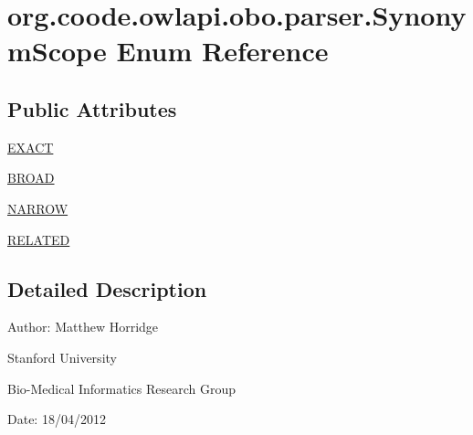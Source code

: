 \hypertarget{enumorg_1_1coode_1_1owlapi_1_1obo_1_1parser_1_1_synonym_scope}{\section{org.\-coode.\-owlapi.\-obo.\-parser.\-Synonym\-Scope Enum Reference}
\label{enumorg_1_1coode_1_1owlapi_1_1obo_1_1parser_1_1_synonym_scope}
}
\subsection*{Public Attributes}
\begin{DoxyCompactItemize}
\item 
\hyperlink{enumorg_1_1coode_1_1owlapi_1_1obo_1_1parser_1_1_synonym_scope_a2563ad43be4853645037f1b107dc4f08}{E\-X\-A\-C\-T}
\item 
\hyperlink{enumorg_1_1coode_1_1owlapi_1_1obo_1_1parser_1_1_synonym_scope_a2f2dd03be7aacef09bf13f6800547131}{B\-R\-O\-A\-D}
\item 
\hyperlink{enumorg_1_1coode_1_1owlapi_1_1obo_1_1parser_1_1_synonym_scope_af12219f678015a480e35d7888f481144}{N\-A\-R\-R\-O\-W}
\item 
\hyperlink{enumorg_1_1coode_1_1owlapi_1_1obo_1_1parser_1_1_synonym_scope_af20c2de5c54a82283f18180ad743cd6c}{R\-E\-L\-A\-T\-E\-D}
\end{DoxyCompactItemize}


\subsection{Detailed Description}
Author\-: Matthew Horridge\par
 Stanford University\par
 Bio-\/\-Medical Informatics Research Group\par
 Date\-: 18/04/2012 

